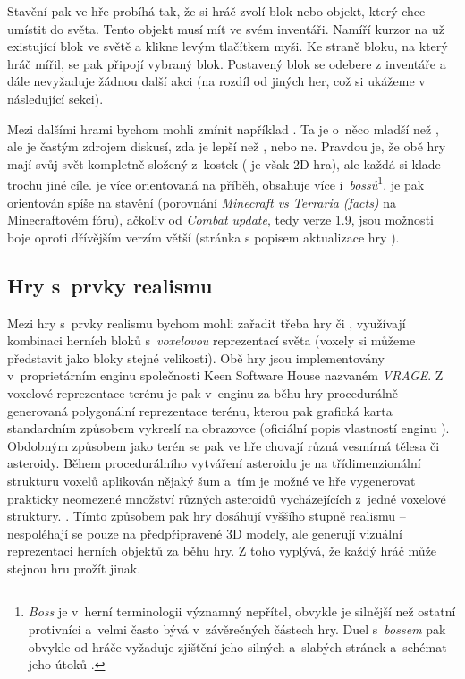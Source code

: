 \FloatBarrier

Stavění pak ve hře probíhá tak, že si hráč zvolí blok nebo objekt, který chce umístit do světa. Tento objekt musí mít ve svém inventáři. Namíří kurzor na už existující blok ve světě a klikne levým tlačítkem myši. Ke straně bloku, na který hráč mířil, se pak připojí vybraný blok. Postavený blok se odebere z inventáře a dále nevyžaduje žádnou další akci (na rozdíl od jiných her, což si ukážeme v následující sekci).


Mezi dalšími hrami bychom mohli zmínit například \TE{}. Ta je o~něco mladší než \MC{}, ale je častým zdrojem diskusí, zda je lepší než \MC{}, nebo ne. Pravdou je, že obě hry mají svůj svět kompletně složený z~kostek (\TE{} je však 2D hra), ale každá si klade trochu jiné cíle. \TE{} je více orientovaná na příběh, obsahuje více \NPC{} i~\textit{bossů}\footnote{\textit{Boss} je v~herní terminologii významný nepřítel, obvykle je silnější než ostatní protivníci a~velmi často bývá v~závěrečných částech hry. Duel s~\textit{bossem} pak obvykle od hráče vyžaduje zjištění jeho silných a~slabých stránek a~schémat jeho útoků \citep{intro_boss}.}. \MC{} je pak orientován spíše na stavění (porovnání \textit{Minecraft vs Terraria (facts)} \citep{mc_te_comparsion} na Minecraftovém fóru), ačkoliv od \textit{Combat update}, tedy verze 1.9, jsou možnosti boje oproti dřívějším verzím větší (stránka s popisem aktualizace hry \citep{mc_combat}).  


\subsection{Hry s~prvky realismu}

Mezi hry s~prvky realismu bychom mohli zařadit třeba hry \SE{} či \ME{}, využívají kombinaci herních bloků s~\textit{voxelovou} reprezentací světa (voxely si můžeme představit jako bloky stejné velikosti). Obě hry jsou implementovány v~proprietárním enginu společnosti Keen Software House nazvaném \textit{VRAGE}\texttrademark{}. Z voxelové reprezentace terénu je pak v~enginu za běhu hry procedurálně generovaná polygonální reprezentace terénu, kterou pak grafická karta standardním způsobem vykreslí na obrazovce (oficiální popis vlastností enginu \citep{vrage}). Obdobným způsobem jako terén se pak ve hře \SE{} chovají různá vesmírná tělesa či asteroidy. Během procedurálního vytváření asteroidu je na třídimenzionální strukturu voxelů  aplikován nějaký šum a~tím je možné ve hře vygenerovat prakticky neomezené množství různých asteroidů vycházejících z~jedné voxelové struktury.  \citep{rosa_blog}. Tímto způsobem pak hry dosáhují vyššího stupně realismu -- nespoléhají se pouze na předpřipravené 3D modely, ale generují vizuální reprezentaci herních objektů za běhu hry. Z toho vyplývá, že každý hráč může stejnou hru prožít jinak. 

